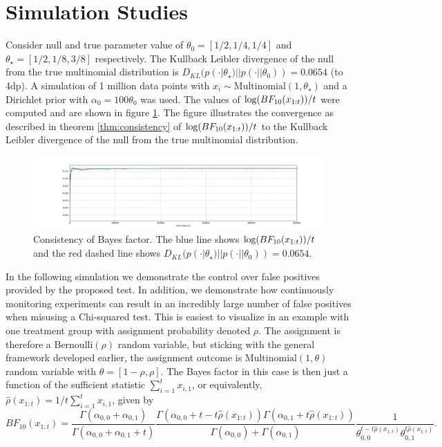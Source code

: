 \documentclass[11pt]{article}
\def\log{{\rm log}}
\begin{document}
\section{Simulation Studies}
\label{sec:simulation}
Consider null and true parameter value of $\theta_0=[1/2, 1/4, 1/4]$ and $\theta_\star=[1/2, 1/8, 3/8]$ respectively. The Kullback Leibler divergence of the null from the true multinomial distribution is $D_{KL}(p(\cdot|\theta_\star)||p(\cdot||\theta_0)) = 0.0654$ (to 4dp). A simulation of 1 million data points with $x_i \sim \text{Multinomial}(1, \theta_\star)$ and a Dirichlet prior with $\alpha_0 = 100\theta_0$ was used. The values of $\log(BF_{10}(x_{1:t}))/t$ were computed and are shown in figure \ref{fig:lbf}. The figure illustrates the convergence as described in theorem \ref{thm:consistency} of $\log(BF_{10}(x_{1:t}))/t$ to the Kullback Leibler divergence of the null from the true multinomial distribution.
\begin{figure}[H]
  \centering
  \includegraphics[scale=0.35]{images/consistency.png}
  \caption{Consistency of Bayes factor. The blue line shows $\log(BF_{10}(x_{1:t}))/t$ and the red dashed line shows $D_{KL}(p(\cdot|\theta_\star)||p(\cdot||\theta_0)) = 0.0654$.}
    \label{fig:lbf}
  \end{figure}
  In the following simulation we demonstrate the control over false positives provided by the proposed test. In addition, we demonstrate how continuously monitoring experiments can result in an incredibly large number of false positives when misusing a Chi-squared test. This is easiest to visualize in an example with one treatment group with assignment probability denoted $\rho$. The assignment is therefore a $\text{Bernoulli}(\rho)$ random variable, but sticking with the general framework developed earlier, the assignment outcome is $\text{Multinomial}(1,\theta)$ random variable with $\theta = [1-\rho, \rho]$. The Bayes factor in this case is then just a function of the sufficient statistic $\sum_{i=1}^t x_{i,1}$, or equivalently, $\hat{\rho}(x_{1:t}) = 1/t \sum_{i=1}^{t} x_{i,1}$, given by
\begin{equation}
  \label{eq:bayes_factor}
 BF_{10}(x_{1:t})  = \frac{\Gamma(\alpha_{0,0}+\alpha_{0,1})}{\Gamma(\alpha_{0,0}+\alpha_{0,1}+t)}\frac{\Gamma(\alpha_{0,0} + t-t\hat{\rho}(x_{1:t} ))\Gamma(\alpha_{0,1} + t\hat{\rho}(x_{1:t} )) }{\Gamma(\alpha_{0,0} )+\Gamma(\alpha_{0,1} )}\frac{1}{\theta_{0,0}^{t-t\hat{\rho}(x_{1:t})}\theta_{0,1}^{t\hat{\rho}(x_{1:t})}}.
\end{equation}
\end{document}
